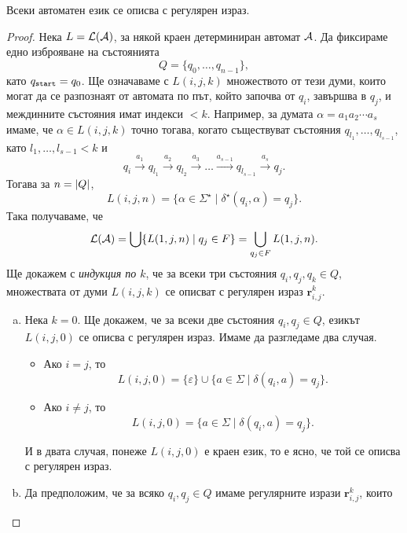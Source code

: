 \begin{framed}
\begin{thm}[Клини]
  \label{th:regular-kleene}
  Всеки автоматен език се описва с регулярен израз.
\end{thm}
\end{framed}
\begin{proof}
  Нека  $L = \mathcal{L}(\mathcal{A})$, за някой краен детерминиран автомат $\mathcal{A}$.
  Да фиксираме едно изброяване на състоянията
  \[Q = \{q_0,\dots,q_{n-1}\},\]
  като $q_{\texttt{start}} = q_0$.
  Ще означаваме с $L(i,j,k)$ множеството от тези думи, които
  могат да се разпознаят от автомата по път, който започва от $q_i$,
  завършва в $q_j$, и междинните състояния имат индекси $< k$.
  Например, за думата $\alpha = a_1a_2\cdots a_s$ имаме, че $\alpha \in L(i,j,k)$
  точно тогава, когато съществуват състояния $q_{l_1},\dots,q_{l_{s-1}}$, като $l_1,\dots,l_{s-1} < k$ и
  \[q_i\stackrel{a_1}{\rightarrow} q_{l_1} \stackrel{a_2}{\rightarrow} q_{l_2} \stackrel{a_3}{\rightarrow} \dots \stackrel{a_{s-1}}{\rightarrow} q_{l_{s-1}}\stackrel{a_s}{\rightarrow} q_j.\]
  Тогава за $n = \vert{Q}\vert$, 
  \[L(i,j,n) = \{\alpha\in\Sigma^\star\mid \delta^\star(q_i,\alpha) = q_j\}.\]
  Така получаваме, че 
  \[\mathcal{L}(\mathcal{A}) = \bigcup\{L(1,j,n)\mid q_j \in F\} = \bigcup_{q_j\in F}L(1,j,n).\]
  Ще докажем с {\em индукция по $k$}, че за всеки три състояния $q_i,q_j,q_k \in Q$, множествата от думи $L(i,j,k)$
  се описват с регулярен израз $\mathbf{r}^k_{i,j}$.
  \begin{enumerate}[a)]
  \item
    Нека $k = 0$. Ще докажем, че за всеки две състояния $q_i,q_j \in Q$, езикът $L(i,j,0)$ се описва с регулярен израз.
    Имаме да разгледаме два случая.
    \begin{itemize}
    \item
      Ако $i = j$, то 
      \begin{equation}
        \label{eq:kleene-equal}
        L(i, j, 0) = \{\varepsilon\}\cup\{a\in\Sigma \mid \delta(q_i,a) = q_j\}.
      \end{equation}
    \item
      Ако $i \neq j$, то
      \[L(i, j, 0) = \{a\in\Sigma \mid \delta(q_i, a) = q_j\}.\]      
    \end{itemize}
    И в двата случая, понеже $L(i,j,0)$ е краен език, то е ясно, че той се описва с регулярен израз.
  \item
    Да предположим, че за всяко $q_i,q_j\in Q$ имаме регулярните изрази $\mathbf{r}^{k}_{i,j}$, които

\end{enumerate}
\end{proof}
